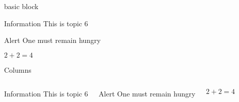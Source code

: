 \documentclass{beamer}
\begin{document}
    
    \begin{frame}{basic block}
        \begin{block}{Information}
            This is topic 6
        \end{block}

        \begin{alertblock}{Alert}
            One must remain hungry
        \end{alertblock}
    
        \begin{example}
            $2 + 2 = 4$
        \end{example}
    \end{frame}

    \begin{frame}{Columns}
        \begin{columns}
            \begin{block}{Information}
                This is topic 6
            \end{block} 

            \begin{alertblock}{Alert}
                One must remain hungry
            \end{alertblock}

            \begin{example}
                $2 + 2 = 4$
            \end{example}
        \end{columns}
    \end{frame}
\end{document}
